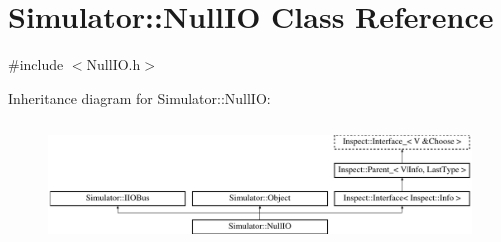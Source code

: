 \hypertarget{class_simulator_1_1_null_i_o}{\section{Simulator\+:\+:Null\+I\+O Class Reference}
\label{class_simulator_1_1_null_i_o}
}


{\ttfamily \#include $<$Null\+I\+O.\+h$>$}

Inheritance diagram for Simulator\+:\+:Null\+I\+O\+:\begin{figure}[H]
\begin{center}
\leavevmode
\includegraphics[height=3.289281cm]{class_simulator_1_1_null_i_o}
\end{center}
\end{figure}

